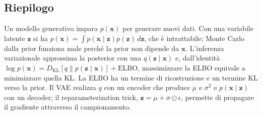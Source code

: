 \documentclass[11pt,a4paper]{article}
\providecommand{\DKL}{D_{\mathrm{KL}}}
\begin{document}

\subsection{Riepilogo}

\begin{importante}
Un modello generativo impara $p(\mathbf{x})$ per generare nuovi dati. Con una
variabile latente $\mathbf{z}$ si ha
$p(\mathbf{x})=\int p(\mathbf{x}\mid\mathbf{z})p(\mathbf{z})\,d\mathbf{z}$, che è
intrattabile; Monte Carlo dalla prior funziona male perché la prior non dipende
da $\mathbf{x}$. L'inferenza variazionale approssima la posterior con una
$q(\mathbf{z}\mid\mathbf{x})$ e, dall'identità
$\log p(\mathbf{x})=\DKL[q\|p(\mathbf{z}\mid\mathbf{x})]+\mathrm{ELBO}$, massimizzare
la ELBO equivale a minimizzare quella KL. La ELBO ha un termine di ricostruzione
e un termine KL verso la prior. Il VAE realizza $q$ con un encoder che produce
$\mu$ e $\sigma^2$ e $p(\mathbf{x}\mid\mathbf{z})$ con un decoder; il
reparameterization trick, $\mathbf{z}=\mu+\sigma\odot\epsilon$, permette di
propagare il gradiente attraverso il campionamento.
\end{importante}
\end{document}
